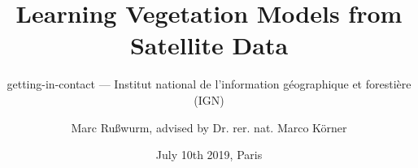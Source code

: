 \documentclass[%
  aspectratio=169,
  9pt,
  USenglish,
  titlegraphic, %
  affiliationintitlepagehead,
  progressbar,
]{beamer}
\title{Learning Vegetation Models from Satellite Data}
\subtitle{getting-in-contact --- Institut national de l'information géographique et forestière (IGN)}
\author[M. Rußwurm]{Marc Rußwurm, advised by Dr. rer. nat. Marco Körner}
\institute[TUM]{Technical University of Munich, Germany\\
                Remote Sensing Technology}
\date{July 10th 2019, Paris}
\begin{document}
\begin{frame}[t]
  \titlepage
\end{frame}

%
%		
%		
\end{document}
